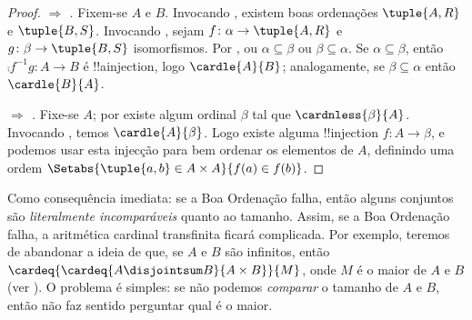 \documentclass[../../../include/open-logic-section]{subfiles}
\begin{document}
\begin{proof}
\emph{ $\Rightarrow$ .} Fixem-se $A$ e
$B$. Invocando , existem boas ordenações $\tuple{A, R}$
e $\tuple{B, S}$. Invocando
, sejam $f \colon
\alpha \to \tuple{A, R}$ e $g \colon \beta \to \tuple{B, S}$
isomorfismos. Por , ou $\alpha \subseteq \beta$ ou $\beta \subseteq \alpha$. Se $\alpha \subseteq \beta$, então $\comp{f^{-1}}{g} \colon A \to B$ é !!a{injection}, logo
$\cardle{A}{B}$; analogamente, se $\beta \subseteq \alpha$ então $\cardle{B}{A}$.

\emph{ $\Rightarrow$ .} Fixe-se $A$; por
 existe algum ordinal $\beta$ tal que
$\cardnless{\beta}{A}$. Invocando , temos
$\cardle{A}{\beta}$. Logo existe alguma !!{injection} $f \colon A \to
\beta$, e podemos usar esta injecção para bem ordenar os elementos de
$A$, definindo uma ordem $\Setabs{\tuple{a, b} \in A \times A}{f(a)
\in f(b)}$.
\end{proof}
\noindent
Como consequência imediata: se a Boa Ordenação falha, então alguns conjuntos
são \emph{literalmente incomparáveis} quanto ao tamanho. Assim, se
a Boa Ordenação falha, a aritmética cardinal transfinita ficará
complicada. Por exemplo, teremos de abandonar a ideia de que, se $A$ e
$B$ são infinitos, então $\cardeq{\cardeq{A \disjointsum B}{A \times
B}}{M}$, onde $M$ é o maior de $A$ e $B$ (ver
). O problema é
simples: se não podemos \emph{comparar} o tamanho de $A$ e $B$, então não faz
sentido perguntar qual é o maior.
\end{document}
